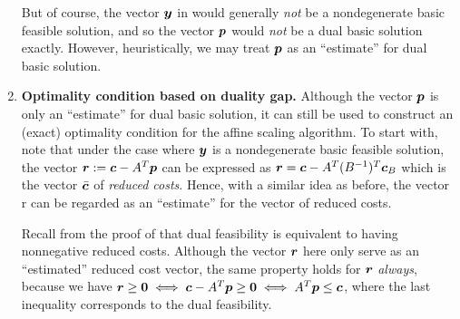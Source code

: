 \begin{enumerate}
But of course, the vector \(\bm{y}\) in 
would generally \emph{not} be a nondegenerate basic feasible solution, and so
the vector \(\bm{p}\) would \emph{not} be a dual basic solution exactly.
However, heuristically, we may treat \(\bm{p}\) as an “estimate” for dual
basic solution.

\item \textbf{Optimality condition based on duality gap.} Although the vector
\(\bm{p}\) is only an “estimate” for dual basic solution, it can still be
used to construct an (exact) optimality condition for the affine scaling
algorithm. To start with, note that under the case where \(\bm{y}\) is a
nondegenerate basic feasible solution, the vector
\(\bm{r}:=\bm{c}-A^{T}\bm{p}\) can be expressed as
\(\bm{r}=\bm{c}-A^{T}(B^{-1})^{T}\bm{c}_{B}\) which is the vector
\(\bar{\bm{c}}\) of \emph{reduced costs}. Hence, with a similar idea as
before, the vector r can be regarded as an ``estimate'' for the vector of
reduced costs.

Recall from the proof of  that dual
feasibility is equivalent to having nonnegative reduced costs. Although the
vector \(\bm{r}\) here only serve as an “estimated” reduced cost vector, the
same property holds for \(\bm{r}\) \emph{always}, because we have
\(\bm{r}\ge\bm{0}\iff \bm{c}-A^{T}\bm{p}\ge\bm{0}\iff
A^{T}\bm{p}\le\bm{c}\), where the last inequality corresponds to the dual
feasibility.


\end{enumerate}
